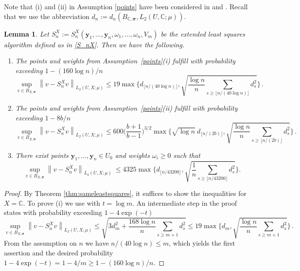 \documentclass[11pt]{article}
\newtheorem{lemma}{Lemma}[section]
\numberwithin{equation}{section}
\theoremstyle{definition}
\theoremstyle{remark}
\newcommand{\norm}[2]{\left\|{#1}\right\|_{#2}}
\newcommand{\by}{{\boldsymbol{y}}}
\newcommand{\bsigma}{{\boldsymbol{\sigma}}}
\def\CC{{\mathbb C}}
\def\CC{{\mathbb C}}
\def\CC{{\mathbb C}}
\begin{document}
{{Note that (i) and (ii) in Assumption \ref{points} have been considered in \cite{KU21a} and 
\cite{BSU23}.
Recall that we use the abbreviation $d_n := d_n(B_{\CC,\bsigma},L_2(U,\CC;\mu))$.

\begin{lemma}\label{lemma:leastsquaresbounds}
	Let 
	$S_{{n}}^X 
	:=
	S_{{n}}^X(\by_1, \dots, \by_{{n}}, \omega_1, \dots, \omega_{{n}}, V_m) $ 
	 be the extended least squares algorithm defined as in \eqref{S_nX}.
    Then we have the following.
	\begin{enumerate}
		\item[\rm (i)]
        The points and weights from Assumption~\ref{points}{\rm (i)} fulfill with probability exceeding $1-(160\log n)/n$
        \begin{equation} \nonumber
            \sup_{v\in B_{X,\bsigma}} \norm{v - S_{n}^X v}{L_2(U,X;\mu)}
            \le 19 \max \Big\{ d_{\lfloor n/(40\log n)\rfloor}, 
            \sqrt{\frac{\log n}{n} \sum_{s \ge \lfloor n/(40\log n)\rfloor} d_s^2 } \Big\} \,.
        \end{equation}
		\item[\rm (ii)]
        The points and weights from Assumption~\ref{points}{\rm (ii)} fulfill with probability exceeding $1-8b/n$
		\begin{equation}\nonumber
			\sup_{v\in B_{X,\bsigma}} \norm{v - S_{n}^X v}{L_2(U,X;\mu)}
            \le 600  \Big(\frac{b+1}{b-1}\Big)^{3/2} 
            \max \Big\{ \sqrt{\log n} \ d_{\lfloor n/(2b)\rfloor}, \sqrt{ \frac{\log n}{n} 
            	\sum_{s\ge \lfloor n/(2b)\rfloor} d_s^2 } \Big\} \,.
		\end{equation}
		\item[\rm (iii)]
        There exist points $\by_1, \dots, \by_n\in U_0$ and weights $\omega_i\ge 0$ such that
		\begin{equation}\nonumber
			\sup_{v\in B_{X,\bsigma}} \norm{v - S_{n}^X v}{L_2(U,X;\mu)}
            \ \le  4325 \max\Big\{ d_{\lfloor n/43200\rfloor}, \sqrt{\frac{1}{n} 
            	\sum_{s \ge \lfloor n/43200\rfloor} d_s^2 } \Big\}.
		\end{equation}
	\end{enumerate}
\end{lemma}

\begin{proof}
    By Theorem \ref{thm:sameleastsquares}, it suffices to show the inequalities for $X = \CC$.
    To prove (i) we use \cite[Theorem~7.7]{barteldiss} with $t=\log m$.
    An intermediate step in the proof states with probability exceeding $1-4\exp(-t)$
    \begin{equation} \nonumber
        \sup_{v\in B_{X,\bsigma}} \norm{v - S_{n}^X v}{L_2(U,X;\mu)}
        \le \sqrt{ 3 d_{m}^2 + \frac{168 \log n}{n} \sum_{s\ge m+1} d_s^2 }
        \le 19 \max\Big\{ d_{m}, \sqrt{ \frac{\log n}{n} \sum_{s\ge m+1} d_s^2 } \Big\} \,.
    \end{equation}
    From the assumption on $n$ we have $ n/(40\log n) \le m$, which yields the first assertion and the desired probability $1-4\exp(-t) = 1-4/m \ge 1-(160\log n)/n$.


\end{proof}}}
\end{document}
